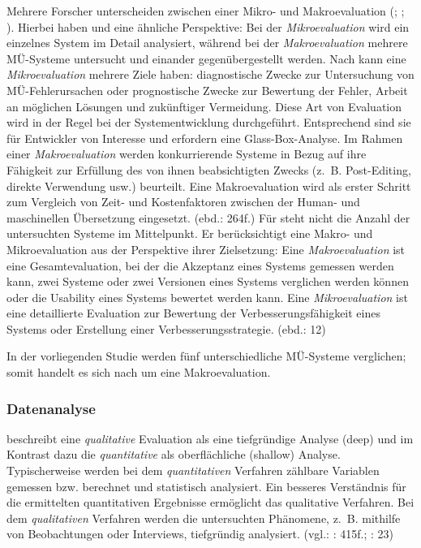 
Mehrere Forscher unterscheiden zwischen einer Mikro- und Makroevaluation (\citealt{VanSlype1979}; \citealt{Sager1994}; \citealt{Weber1998}). Hierbei haben \citet[64]{Weber1998} und \citet[264f.]{Sager1994} eine ähnliche Perspektive: Bei der \textit{Mikroevaluation} wird ein einzelnes System im Detail analysiert, während bei der \textit{Makroevaluation} mehrere MÜ-Systeme untersucht und einander gegenübergestellt werden. Nach \citet[265]{Sager1994} kann eine \textit{Mikroevaluation} mehrere Ziele haben: diagnostische Zwecke zur Untersuchung von MÜ-Fehlerursachen oder prognostische Zwecke zur Bewertung der Fehler, Arbeit an möglichen Lösungen und zukünftiger Vermeidung. Diese Art von Evaluation wird in der Regel bei der Systementwicklung durchgeführt. Entsprechend sind sie für Entwickler von Interesse und erfordern eine Glass-Box-Analyse. Im Rahmen einer \textit{Makroevaluation} werden konkurrierende Systeme in Bezug auf ihre Fähigkeit zur Erfüllung des von ihnen beabsichtigten Zwecks (z.~B. Post-Editing, direkte Verwendung usw.) beurteilt. Eine Makroevaluation wird als erster Schritt zum Vergleich von Zeit- und Kostenfaktoren zwischen der Human- und maschinellen Übersetzung eingesetzt. (ebd.: 264f.) Für \citet{VanSlype1979} steht nicht die Anzahl der untersuchten Systeme im Mittelpunkt. Er berücksichtigt eine Makro- und Mikroevaluation aus der Perspektive ihrer Zielsetzung: Eine \textit{Makroevaluation} ist eine Gesamtevaluation, bei der die Akzeptanz eines Systems gemessen werden kann, zwei Systeme oder zwei Versionen eines Systems verglichen werden können oder die Usability eines Systems bewertet werden kann. Eine \textit{Mikroevaluation} ist eine detaillierte Evaluation zur Bewertung der Verbesserungsfähigkeit eines Systems oder Erstellung einer Verbesserungsstrategie. (ebd.: 12)

In der vorliegenden Studie werden fünf unterschiedliche MÜ-Systeme verglichen; somit handelt es sich nach \citet{Weber1998} um eine Makroevaluation.

\subsubsection{Datenanalyse}



\citet[64]{Weber1998} beschreibt eine \textit{qualitative} Evaluation als eine tiefgründige Analyse  (deep) und im Kontrast dazu die \textit{quantitative} als oberflächliche (shallow) Analyse. Typischerweise werden bei dem \textit{quantitativen} Verfahren zählbare Variablen gemessen bzw. berechnet und statistisch analysiert. Ein besseres Verständnis für die ermittelten quantitativen Ergebnisse ermöglicht das qualitative Verfahren. Bei dem \textit{qualitativen} Verfahren werden die untersuchten Phänomene, z.~B. mithilfe von Beobachtungen oder Interviews, tiefgründig analysiert. (vgl.: \citealt{CreswellClark2007}: 415f.; \citealt{SaldanhaOBrien2014}: 23)

